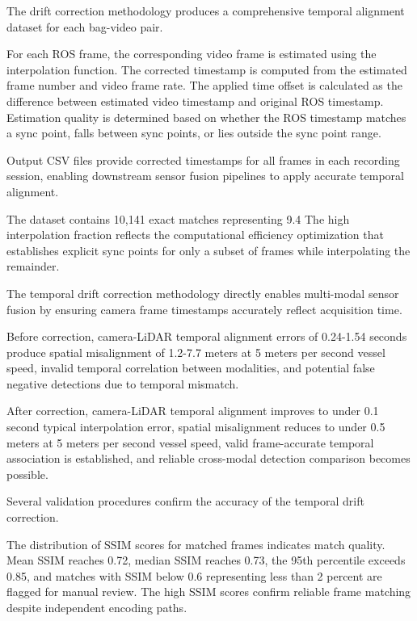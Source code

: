 \documentclass{erauthesis}
\begin{document}

The drift correction methodology produces a comprehensive temporal alignment dataset for each bag-video pair.

For each ROS frame, the corresponding video frame is estimated using the interpolation function.
The corrected timestamp is computed from the estimated frame number and video frame rate.
The applied time offset is calculated as the difference between estimated video timestamp and original ROS timestamp.
Estimation quality is determined based on whether the ROS timestamp matches a sync point, falls between sync points, or lies outside the sync point range.

Output CSV files provide corrected timestamps for all frames in each recording session, enabling downstream sensor fusion pipelines to apply accurate temporal alignment.

The dataset contains 10,141 exact matches representing 9.4%
The high interpolation fraction reflects the computational efficiency optimization that establishes explicit sync points for only a subset of frames while interpolating the remainder.


The temporal drift correction methodology directly enables multi-modal sensor fusion by ensuring camera frame timestamps accurately reflect acquisition time.

Before correction, camera-LiDAR temporal alignment errors of 0.24-1.54 seconds produce spatial misalignment of 1.2-7.7 meters at 5 meters per second vessel speed, invalid temporal correlation between modalities, and potential false negative detections due to temporal mismatch.

After correction, camera-LiDAR temporal alignment improves to under 0.1 second typical interpolation error, spatial misalignment reduces to under 0.5 meters at 5 meters per second vessel speed, valid frame-accurate temporal association is established, and reliable cross-modal detection comparison becomes possible.


Several validation procedures confirm the accuracy of the temporal drift correction.


The distribution of SSIM scores for matched frames indicates match quality.
Mean SSIM reaches 0.72, median SSIM reaches 0.73, the 95th percentile exceeds 0.85, and matches with SSIM below 0.6 representing less than 2 percent are flagged for manual review.
The high SSIM scores confirm reliable frame matching despite independent encoding paths.
\end{document}
